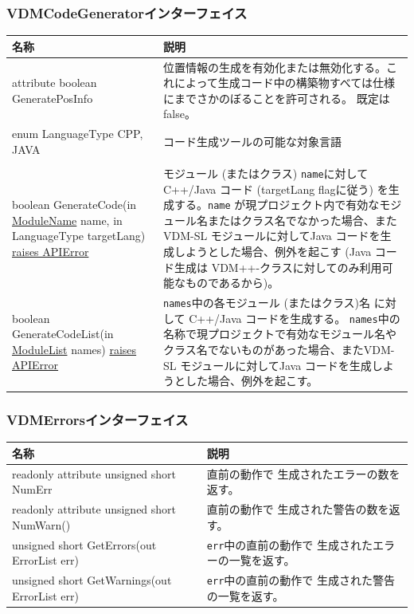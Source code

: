 \documentclass[\pformat,12pt]{jarticle}
\newcommand{\pbs}[1]{\let\temp=\\#1\let\\=\temp}
\newenvironment{interfacetable}{%
  \begin{longtable}{|>{\pbs\raggedright\ttfamily}p{6.6cm}%
                    |>{\pbs\raggedright}p{6.6cm}|} \hline
  \textrm{\bfseries 名称} &  \textbf{説明} \\ \hline
  \endhead
  }{\end{longtable}}
\newcommand{\APIError}{\hyperlink{exception.APIError}{raises APIError}}
\newcommand{\ModuleName}{\hyperlink{type.ModuleName}{ModuleName}}
\newcommand{\ModuleList}{\hyperlink{type.ModuleList}{ModuleList}}
\begin{document}
\subsubsection{VDMCodeGeneratorインターフェイス}
\mbox{}
\begin{interfacetable}
attribute boolean GeneratePosInfo
  & 位置情報の生成を有効化または無効化する。これによって生成コード中の構築物すべては仕様にまでさかのぼることを許可される。 既定は \textsf{false}。 
\\ \hline
enum LanguageType {CPP, JAVA}
  & コード生成ツールの可能な対象言語\\
\\ \hline
boolean GenerateCode(in {\ModuleName} name, in LanguageType targetLang) \APIError
  & モジュール (またはクラス) \texttt{name}に対して C++/Java コード (targetLang flagに従う) を生成する。\texttt{name} が現プロジェクト内で有効なモジュール名またはクラス名でなかった場合、またVDM-SL モジュールに対してJava コードを生成しようとした場合、例外を起こす (Java コード生成は VDM++-クラスに対してのみ利用可能なものであるから)。
\\ \hline
boolean GenerateCodeList(in {\ModuleList} names) \APIError
  & \texttt{names}中の各モジュール (またはクラス)名 に対して C++/Java コードを生成する。 \texttt{names}中の名称で現プロジェクトで有効なモジュール名やクラス名でないものがあった場合、またVDM-SL モジュールに対してJava コードを生成しようとした場合、例外を起こす。

\\ \hline
\end{interfacetable}

\subsubsection{VDMErrorsインターフェイス}
\mbox{}
\begin{interfacetable}
readonly attribute unsigned short NumErr
                                        & 直前の動作で
                                          生成されたエラーの数を返す。
\\ \hline
readonly attribute unsigned short NumWarn()
                                        & 直前の動作で
                                          生成された警告の数を返す。
\\ \hline
unsigned short GetErrors(out ErrorList err)  
                                        & \texttt{err}中の直前の動作で
                                          生成されたエラーの一覧を返す。
\\ \hline
unsigned short GetWarnings(out ErrorList err)
                                        & \texttt{err}中の直前の動作で
                                          生成された警告の一覧を返す。
\\ \hline
\end{interfacetable}
\end{document}
